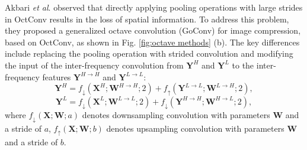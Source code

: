 Akbari \textit{et al}. \cite{akbari2021learned} observed that directly applying pooling operations with large strides in OctConv results in the loss of spatial information. To address this problem, they proposed a generalized octave convolution (GoConv) for image compression, based on OctConv, as shown in Fig. \ref{fig:octave methods} (b). The key differences include replacing the pooling operation with strided convolution and modifying the input of the inter-frequency convolution from \(\bm{Y}^H\) and \(\bm{Y}^L\) to the inter-frequency features \(\bm{Y}^{H \rightarrow H}\) and \(\bm{Y}^ {L \rightarrow L}\):
\begin{equation}
\bm{Y}^H = f_{\downarrow}\left(\bm{X}^H; \bm{W}^{H \rightarrow H}; 2\right) + f_{\uparrow}\left(\bm{Y}^{L \rightarrow L}; \bm{W}^{L \rightarrow H}; 2\right),
\end{equation}
\begin{equation}
\bm{Y}^L = f_{\downarrow}\left(\bm{X}^L; \bm{W}^{L \rightarrow L}; 2\right) + f_{\downarrow}\left(\bm{Y}^{H \rightarrow H}; \bm{W}^{H \rightarrow L}; 2\right),
\end{equation}
where $f_{\downarrow}(\bm{X};\bm{W};a)$ denotes downsampling convolution with parameters $\bm{W}$ and a stride of \( a \), $f_{\uparrow}(\bm{X};\bm{W};b)$ denotes upsampling convolution with parameters $\bm{W}$ and a stride of \( b \).

